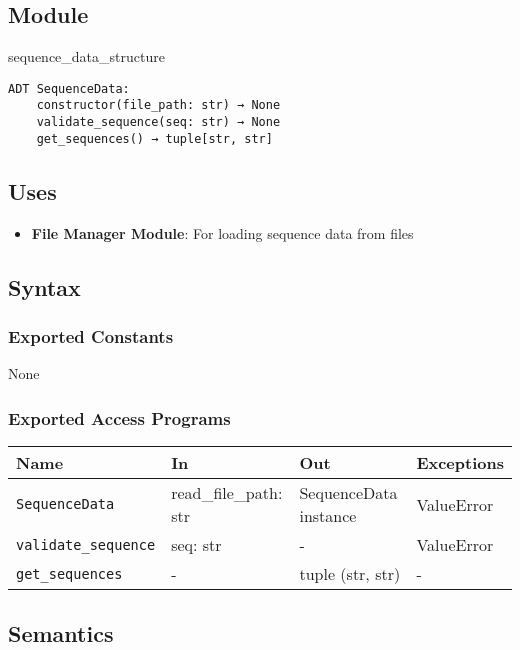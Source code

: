 \documentclass[12pt, titlepage]{article}
\begin{document}
\subsection{Module}

sequence\_data\_structure

\begin{verbatim}
ADT SequenceData:
    constructor(file_path: str) → None
    validate_sequence(seq: str) → None
    get_sequences() → tuple[str, str]
\end{verbatim}


\subsection{Uses}

\begin{itemize}
    \item \textbf{File Manager Module}: For loading sequence data from files
\end{itemize}

\subsection{Syntax}

\subsubsection{Exported Constants}

None

\subsubsection{Exported Access Programs}

\begin{center}
\begin{tabular}{p{4cm} p{4cm} p{3cm} p{2cm}}
\hline
\textbf{Name} & \textbf{In} & \textbf{Out} & \textbf{Exceptions} \\
\hline
\texttt{SequenceData} & read\_file\_path: str & SequenceData instance & ValueError \\
\texttt{validate\_sequence} & seq: str & - & ValueError \\
\texttt{get\_sequences} & - & tuple (str, str) & - \\
\hline
\end{tabular}
\end{center}

\subsection{Semantics}
\end{document}
